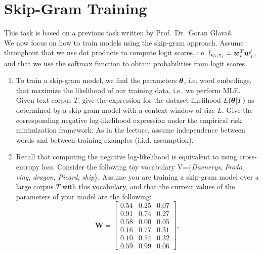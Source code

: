 \documentclass[11pt,a4paper]{article}
\begin{document}
\section{Skip-Gram Training}


This task is based on a previous task written by Prof.\ Dr.\ Goran Glava\v{s}. \\

We now focus on how to train models using the skip-gram approach.
Assume throughout that we use dot products to compute logit scores, i.e.
$l_{w_i,c_j} = {\boldsymbol{w}}_i^T{\boldsymbol{w}}'_j$, and that we use the softmax function to obtain
probabilities from logit scores

\begin{enumerate}[label=(\alph*)]
    \item To train a skip-gram model, we find the parameters ${\boldsymbol{\theta}}$, i.e.
          word embedings, that maximize the likelihood of our training data,
          i.e.\ we perform MLE.
          Given text corpus $T$, give the expression for the dataset likelihood
          $L({\boldsymbol{\theta}}|T)$ as determined by a skip-gram model with a context
          window of size $L$.
          Give the corresponding negative log-likelihood expression under the
          empirical risk minimization framework.
          As in the lecture, assume independence between words and between 
          training examples (i.i.d. assumption).
    \item Recall that computing the negative log-likelihood is equivalent to
          using cross-entropy loss.
          Consider the following toy vocabulary
          V=\{\textit{Daenerys}, \textit{Frodo}, \textit{ring}, \textit{dragon}, \textit{Picard}, \textit{ship}\}.
          Assume you are training a skip-gram model over a large corpus $T$ with
          this vocabulary, and that the current values of the parameters of your
          model are the following:
          \[
              \mathbf{W}=
              \begin{bmatrix}
                  0.54 & 0.25 & 0.07 \\
                  0.91 & 0.74 & 0.27 \\
                  0.58 & 0.00 & 0.05 \\
                  0.16 & 0.77 & 0.31 \\
                  0.10 & 0.54 & 0.32 \\
                  0.59 & 0.99 & 0.06
              \end{bmatrix},
\]
\end{enumerate}
\end{document}
